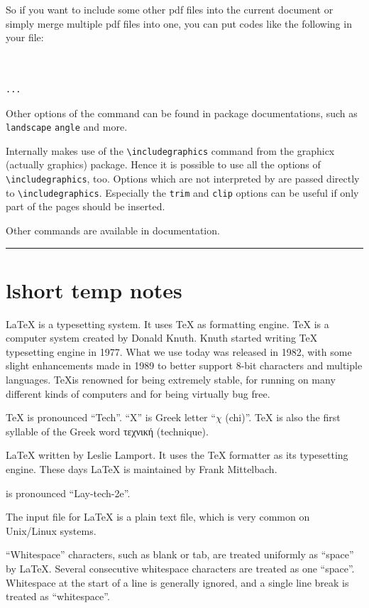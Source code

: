\documentclass[a4paper,oneside]{book}
\newcommand{\shortline}{\noindent\rule[1mm]{30mm}{0.1mm}}
\newcommand{\package}[1]{\textsf{#1}}
\begin{document}
So if you want to include some other pdf files into the current document or simply merge multiple pdf files into one, you can put codes like the following in your file:
\begin{verbatim}


...
\end{verbatim}

Other options of the command can be found in package documentations, such as \verb|landscape| \verb|angle| and more.

Internally \verb|| makes use of the \verb|\includegraphics| command from the \package{graphicx} (actually \package{graphics}) package. Hence it is possible to use all the options of \verb|\includegraphics|, too. Options which are not interpreted by \verb|| are passed directly to \verb|\includegraphics|. Especially the \verb|trim| and \verb|clip| options can be useful if only part of the pages should be inserted.

Other commands are available in documentation.

\shortline


\chapter{lshort temp notes}
\LaTeX{} is a typesetting system. It uses \TeX{} as formatting engine.
\TeX{} is a computer system created by Donald Knuth. Knuth started writing \TeX{} typesetting engine in 1977. What we use today was released in 1982, with some slight enhancements made in 1989 to better support 8-bit characters and multiple languages.
\TeX is renowned for being extremely stable, for running on many different kinds of computers and for being virtually bug free.

\TeX{} is pronounced ``Tech''. ``X'' is Greek letter ``$\chi$ (chi)''. \TeX{} is also the first syllable of the Greek word τεχνική (technique). 

\LaTeX{} written by Leslie Lamport. It uses the \TeX{} formatter as its typesetting engine. These days \LaTeX{} is maintained by Frank Mittelbach.

\LaTeXe{} is pronounced ``Lay-tech-2e''.

The input file for \LaTeX{} is a plain text file, which is very common on Unix/Linux systems.

``Whitespace'' characters, such as blank or tab, are treated uniformly as ``space'' by \LaTeX. Several consecutive whitespace characters are treated as one ``space''.
Whitespace at the start of a line is generally ignored, and a single line break is treated as ``whitespace''.
\end{document}
